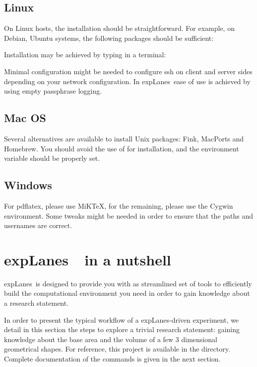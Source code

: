 \documentclass[a4paper,fleqn]{tufte-handout}
\newcommand{\explanes}{\textsf{expLanes}\ }
\begin{document}
\subsection{Linux}

On Linux hosts, the installation should be straightforward. For example, on Debian, Ubuntu systems, the following packages should be sufficient:


Installation may be achieved by typing in a terminal: 


Minimal configuration might be needed to configure ssh on client and server sides depending on your network configuration. In \explanes ease of use is achieved by using empty passphrase logging.

\subsection{Mac OS}

Several alternatives are available to install Unix packages: Fink, MacPorts and Homebrew. You should avoid the use of  for installation, and the  environment variable should be properly set.

\subsection{Windows}

For pdflatex, please use MiKTeX, for the remaining, please use the Cygwin environment. Some tweaks might be needed in order to ensure that the paths and usernames are correct.

\section{\explanes\ in a nutshell}
\hypertarget{nutshell}{}
 
\explanes is designed to provide you with as streamlined set of tools to efficiently build the computational environment you need in order to gain knowledge about a research statement.

In order to present the typical workflow of a \textsf{expLanes}-driven experiment, we detail in this section the steps to explore a trivial research statement: gaining knowledge about the base area and the volume of a few 3 dimensional geometrical shapes. For reference, this project is available in the  directory. Complete documentation of the commands is given in the next section.%
\end{document}
